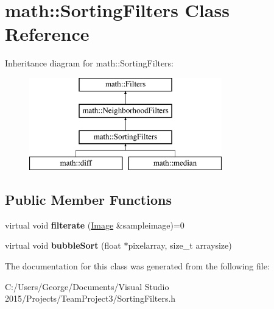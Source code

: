 \hypertarget{classmath_1_1_sorting_filters}{}\section{math\+:\+:Sorting\+Filters Class Reference}
\label{classmath_1_1_sorting_filters}
Inheritance diagram for math\+:\+:Sorting\+Filters\+:\begin{figure}[H]
\begin{center}
\leavevmode
\includegraphics[height=4.000000cm]{classmath_1_1_sorting_filters}
\end{center}
\end{figure}
\subsection*{Public Member Functions}
\begin{DoxyCompactItemize}
\item 
\mbox{\label{classmath_1_1_sorting_filters_a50faab9426081c8c685b885e71266963}} 
virtual void {\bfseries filterate} (\hyperlink{classmath_1_1_image}{Image} \&sampleimage)=0
\item 
\mbox{\label{classmath_1_1_sorting_filters_a102e6a36d0d0ed2505723ed97b0da1d6}} 
virtual void {\bfseries bubble\+Sort} (float $\ast$pixelarray, size\+\_\+t arraysize)
\end{DoxyCompactItemize}


The documentation for this class was generated from the following file\+:\begin{DoxyCompactItemize}
\item 
C\+:/\+Users/\+George/\+Documents/\+Visual Studio 2015/\+Projects/\+Team\+Project3/Sorting\+Filters.\+h\end{DoxyCompactItemize}
